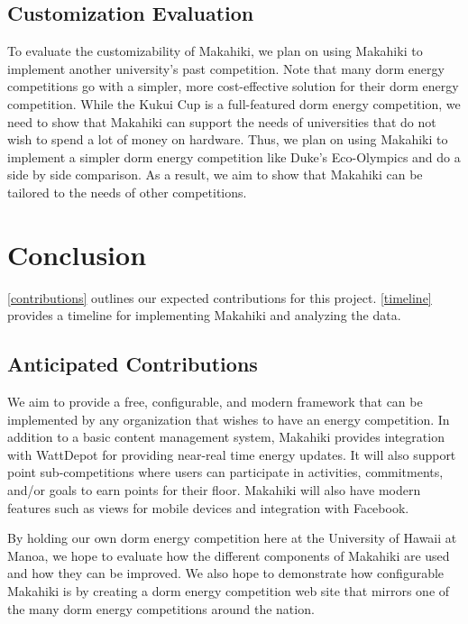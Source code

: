 \section{Customization Evaluation}
\label{customization}

To evaluate the customizability of Makahiki, we plan on using Makahiki to implement another university's past competition.  Note that many dorm energy competitions go with a simpler, more cost-effective solution for their dorm energy competition.  While the Kukui Cup is a full-featured dorm energy competition, we need to show that Makahiki can support the needs of universities that do not wish to spend a lot of money on hardware.  Thus, we plan on using Makahiki to implement a simpler dorm energy competition like Duke's Eco-Olympics and do a side by side comparison.  As a result, we aim to show that Makahiki can be tailored to the needs of other competitions.

\chapter{Conclusion}
\label{conclusion}

\autoref{contributions} outlines our expected contributions for this project.  \autoref{timeline} provides a timeline for implementing Makahiki and analyzing the data.

\section{Anticipated Contributions}
\label{contributions}

We aim to provide a free, configurable, and modern framework that can be implemented by any organization that wishes to have an energy competition.  In addition to a basic content management system, Makahiki provides integration with WattDepot for providing near-real time energy updates.  It will also support point sub-competitions where users can participate in activities, commitments, and/or goals to earn points for their floor.  Makahiki will also have modern features such as views for mobile devices and integration with Facebook.

By holding our own dorm energy competition here at the University of Hawaii at Manoa, we hope to evaluate how the different components of Makahiki are used and how they can be improved.  We also hope to demonstrate how configurable Makahiki is by creating a dorm energy competition web site that mirrors one of the many dorm energy competitions around the nation.

